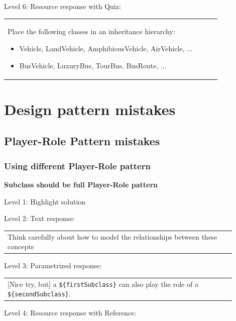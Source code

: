 \noindent Level 6: Resource response with Quiz: \medskip

\begin{tabular}{|p{0.9\linewidth}}
Place the following classes in an inheritance hierarchy:

\begin{itemize}
    \item Vehicle, LandVehicle, AmphibiousVehicle, AirVehicle, ...
    \item BusVehicle, LuxuryBus, TourBus, BusRoute, ...
\end{itemize}

\end{tabular} \medskip




\section{Design pattern mistakes}

\subsection{Player-Role Pattern mistakes}

\subsubsection{Using different Player-Role pattern}

\noindent \textbf{Subclass should be full Player-Role pattern} \medskip

\noindent Level 1: Highlight solution \medskip

\noindent Level 2: Text response: \medskip

\begin{tabular}{|p{0.9\linewidth}}
Think carefully about how to model the relationships between these concepts
\end{tabular} \medskip

\noindent Level 3: Parametrized response: \medskip

\begin{tabular}{|p{0.9\linewidth}}
[Nice try, but] a \verb|${firstSubclass}| can also play the role of a \verb|${secondSubclass}|.
\end{tabular} \medskip

\noindent Level 4: Resource response with Reference: \medskip


